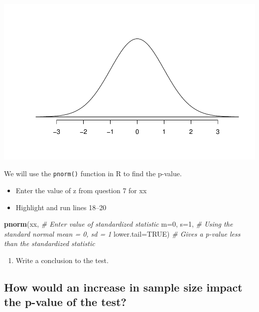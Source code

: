 \documentclass[
]{report}
\newenvironment{Shaded}{\begin{snugshade}}{\end{snugshade}}
\newcommand{\AttributeTok}[1]{\textcolor[rgb]{0.13,0.29,0.53}{#1}}
\newcommand{\CommentTok}[1]{\textcolor[rgb]{0.56,0.35,0.01}{\textit{#1}}}
\newcommand{\ConstantTok}[1]{\textcolor[rgb]{0.56,0.35,0.01}{#1}}
\newcommand{\DecValTok}[1]{\textcolor[rgb]{0.00,0.00,0.81}{#1}}
\newcommand{\FunctionTok}[1]{\textcolor[rgb]{0.13,0.29,0.53}{\textbf{#1}}}
\newcommand{\NormalTok}[1]{#1}
\providecommand{\tightlist}{%
  \setlength{\itemsep}{0pt}\setlength{\parskip}{0pt}}
\begin{document}
\vspace{1mm}

\begin{center}\includegraphics[width=0.5\linewidth]{09-A19-inference-2cat-theory_files/figure-latex/simpleNormal-1} \end{center}

\vspace{0.6in}

We will use the \texttt{pnorm()} function in R to find the p-value.

\begin{itemize}
\item
  Enter the value of z from question 7 for xx
\item
  Highlight and run lines 18--20
\end{itemize}

\begin{Shaded}
\begin{Highlighting}[]
\FunctionTok{pnorm}\NormalTok{(xx, }\CommentTok{\# Enter value of standardized statistic}
      \AttributeTok{m=}\DecValTok{0}\NormalTok{, }\AttributeTok{s=}\DecValTok{1}\NormalTok{, }\CommentTok{\# Using the standard normal mean = 0, sd = 1}
      \AttributeTok{lower.tail=}\ConstantTok{TRUE}\NormalTok{) }\CommentTok{\# Gives a p{-}value less than the standardized statistic}
\end{Highlighting}
\end{Shaded}

\begin{enumerate}
\def\labelenumi{\arabic{enumi}.}
\setcounter{enumi}{8}
\tightlist
\item
  Write a conclusion to the test.
\end{enumerate}

\vspace{1in}

\subsection*{How would an increase in sample size impact the p-value of the test?}\label{how-would-an-increase-in-sample-size-impact-the-p-value-of-the-test}
\end{document}
